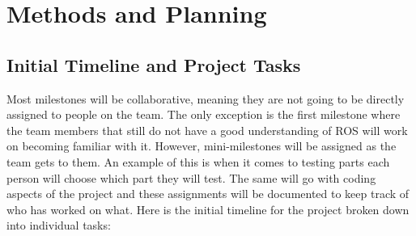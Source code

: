 \documentclass[conference]{IEEEtran}
\begin{document}
\section{Methods and Planning}


\subsection{Initial Timeline and Project Tasks}\label{AA}
Most milestones will be collaborative, meaning they are not going to be directly assigned to people on the team. The only exception is the first milestone where the team members that still do not have a good understanding of ROS will work on becoming familiar with it. However, mini-milestones will be assigned as the team gets to them. An example of this is when it comes to testing parts each person will choose which part they will test. The same will go with coding aspects of the project and these assignments will be documented to keep track of who has worked on what. Here is the initial timeline for the project broken down into individual tasks:
\end{document}
